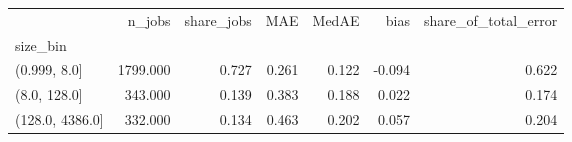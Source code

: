 \begin{tabular}{lrrrrrr}
\toprule
 & n_jobs & share_jobs & MAE & MedAE & bias & share_of_total_error \\
size_bin &  &  &  &  &  &  \\
\midrule
(0.999, 8.0] & 1799.000 & 0.727 & 0.261 & 0.122 & -0.094 & 0.622 \\
(8.0, 128.0] & 343.000 & 0.139 & 0.383 & 0.188 & 0.022 & 0.174 \\
(128.0, 4386.0] & 332.000 & 0.134 & 0.463 & 0.202 & 0.057 & 0.204 \\
\bottomrule
\end{tabular}
